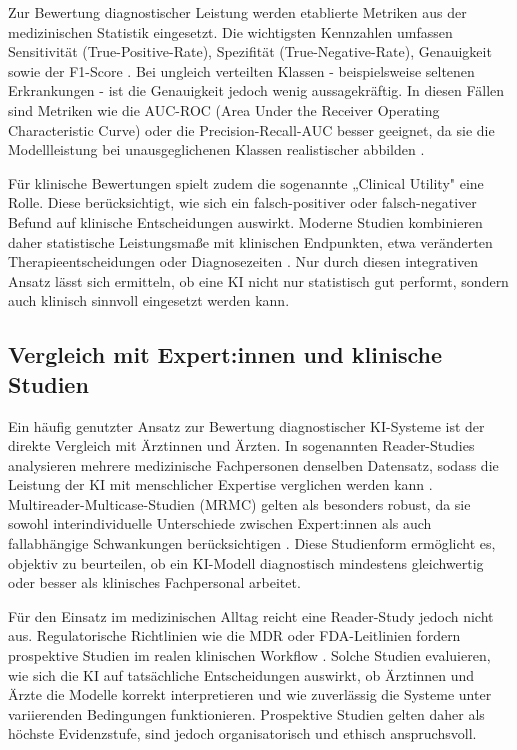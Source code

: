 \documentclass[lettersize,journal]{IEEEtran}
\begin{document}
	Zur Bewertung diagnostischer Leistung werden etablierte Metriken aus der medizinischen Statistik eingesetzt. Die wichtigsten Kennzahlen umfassen Sensitivität (True-Positive-Rate), Spezifität (True-Negative-Rate), Genauigkeit sowie der F1-Score \cite{ref:jurman2012comparison}. Bei ungleich verteilten Klassen - beispielsweise seltenen Erkrankungen - ist die Genauigkeit jedoch wenig aussagekräftig. In diesen Fällen sind Metriken wie die AUC-ROC (Area Under the Receiver Operating Characteristic Curve) oder die Precision-Recall-AUC besser geeignet, da sie die Modellleistung bei unausgeglichenen Klassen realistischer abbilden \cite{ref:saito2015precision}.
	
	Für klinische Bewertungen spielt zudem die sogenannte „Clinical Utility" eine Rolle. Diese berücksichtigt, wie sich ein falsch-positiver oder falsch-negativer Befund auf klinische Entscheidungen auswirkt. Moderne Studien kombinieren daher statistische Leistungsmaße mit klinischen Endpunkten, etwa veränderten Therapieentscheidungen oder Diagnosezeiten \cite{ref:brat2020realworld}. Nur durch diesen integrativen Ansatz lässt sich ermitteln, ob eine KI nicht nur statistisch gut performt, sondern auch klinisch sinnvoll eingesetzt werden kann.
	
	\subsection{Vergleich mit Expert:innen und klinische Studien}

	Ein häufig genutzter Ansatz zur Bewertung diagnostischer KI-Systeme ist der direkte Vergleich mit Ärztinnen und Ärzten. In sogenannten Reader-Studies analysieren mehrere medizinische Fachpersonen denselben Datensatz, sodass die Leistung der KI mit menschlicher Expertise verglichen werden kann \cite{ref:lakhani2017deep}. Multireader-Multicase-Studien (MRMC) gelten als besonders robust, da sie sowohl interindividuelle Unterschiede zwischen Expert:innen als auch fallabhängige Schwankungen berücksichtigen \cite{ref:berbaum1992mrmc}. Diese Studienform ermöglicht es, objektiv zu beurteilen, ob ein KI-Modell diagnostisch mindestens gleichwertig oder besser als klinisches Fachpersonal arbeitet.
	
	Für den Einsatz im medizinischen Alltag reicht eine Reader-Study jedoch nicht aus. Regulatorische Richtlinien wie die MDR oder FDA-Leitlinien fordern prospektive Studien im realen klinischen Workflow \cite{ref:fdaprinciples}. Solche Studien evaluieren, wie sich die KI auf tatsächliche Entscheidungen auswirkt, ob Ärztinnen und Ärzte die Modelle korrekt interpretieren und wie zuverlässig die Systeme unter variierenden Bedingungen funktionieren. Prospektive Studien gelten daher als höchste Evidenzstufe, sind jedoch organisatorisch und ethisch anspruchsvoll.
	
\end{document}

